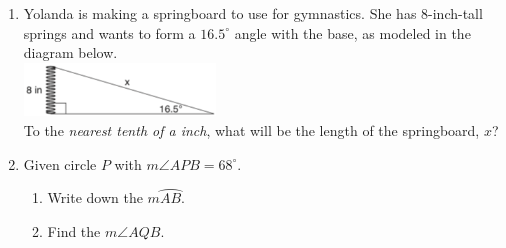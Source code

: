 \documentclass[12pt, twoside]{article}
\begin{document}
\begin{enumerate}
  \item Yolanda is making a springboard to use for gymnastics. She has 8-inch-tall springs and wants to form a $16.5^\circ$ angle with the base, as modeled in the diagram below.\\[0.3cm]
    \includegraphics[width=0.4\textwidth]{spring_Aug2018-6.png}\\
  To the \emph{nearest tenth of a inch}, what will be the length of the springboard, $x$?
  \vspace{3.5cm}

\newpage

  \item Given circle $P$ with $m \angle APB=68^\circ$.
    \begin{multicols}{2}
     \raggedcolumns
     \begin{enumerate}
       \item Write down the $m \wideparen{AB}$. \vspace{1.7cm}
       \item Find the $m\angle AQB$. \vspace{2cm}
     \end{enumerate}
    \end{multicols} \vspace{1cm}


\end{enumerate}
\end{document}
